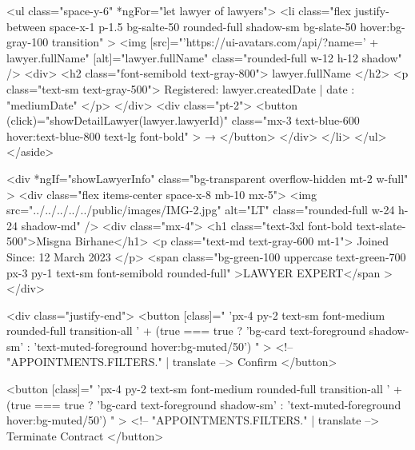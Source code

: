         <ul class="space-y-6" *ngFor="let lawyer of lawyers">
          <li
            class="flex justify-between space-x-1 p-1.5 bg-salte-50 rounded-full shadow-sm bg-slate-50 hover:bg-gray-100 transition"
          >
            <img
              [src]="'https://ui-avatars.com/api/?name=' + lawyer.fullName"
              [alt]="lawyer.fullName"
              class="rounded-full w-12 h-12 shadow"
            />
            <div>
              <h2 class="font-semibold text-gray-800">{{ lawyer.fullName }}</h2>
              <p class="text-sm text-gray-500">
                Registered: {{ lawyer.createdDate | date : "mediumDate" }}
              </p>
            </div>
            <div class="pt-2">
              <button
                (click)="showDetailLawyer(lawyer.lawyerId)"
                class="mx-3 text-blue-600 hover:text-blue-800 text-lg font-bold"
              >
                →
              </button>
            </div>
          </li>
        </ul>
      </aside>

      <div
        *ngIf="showLawyerInfo"
        class="bg-transparent overflow-hidden mt-2 w-full"
      >
        <div class="flex items-center space-x-8 mb-10 mx-5">
          <img
            src="../../../../../public/images/IMG-2.jpg"
            alt="LT"
            class="rounded-full w-24 h-24 shadow-md"
          />
          <div class="mx-4">
            <h1 class="text-3xl font-bold text-slate-500">Misgna Birhane</h1>
            <p class="text-md text-gray-600 mt-1">
              Joined Since: 12 March 2023
            </p>
            <span
              class="bg-green-100 uppercase text-green-700 px-3 py-1 text-sm font-semibold rounded-full"
              >LAWYER EXPERT</span
            >
          </div>

          <div class="justify-end">
            <button
              [class]="
                'px-4 py-2 text-sm font-medium rounded-full transition-all ' +
                (true === true
                  ? 'bg-card text-foreground shadow-sm'
                  : 'text-muted-foreground hover:bg-muted/50')
              "
            >
              <!-- {{ "APPOINTMENTS.FILTERS." | translate }} -->
              Confirm
            </button>

            <button
              [class]="
                'px-4 py-2 text-sm font-medium rounded-full transition-all ' +
                (true === true
                  ? 'bg-card text-foreground shadow-sm'
                  : 'text-muted-foreground hover:bg-muted/50')
              "
            >
              <!-- {{ "APPOINTMENTS.FILTERS." | translate }} -->
              Terminate Contract
            </button>

